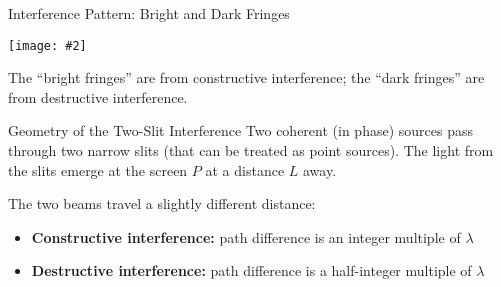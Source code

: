 \documentclass[12pt,compress,aspectratio=169]{beamer}
\newcommand{\pic}[2]{\texttt{[image: \#2]}}
\begin{document}
\begin{frame}{Interference Pattern: Bright and Dark Fringes}
  \begin{center}
    \pic{.4}{graphics/fringes1.png}
  \end{center}
  The ``bright fringes'' are from constructive interference; the ``dark
  fringes'' are from destructive interference.
\end{frame}



\begin{frame}{Geometry of the Two-Slit Interference}
  Two coherent (in phase) sources pass through two narrow slits (that can be
  treated as point sources). The light from the slits emerge at the screen $P$
  at a distance $L$ away.
  \begin{center}
  \end{center}
  \vspace{-.1in}The two beams travel a slightly different distance:
  \begin{itemize}
  \item\textbf{Constructive interference:} path difference is an integer
    multiple  of $\lambda$
  \item\textbf{Destructive interference:} path difference is a half-integer
    multiple  of $\lambda$
  \end{itemize}
\end{frame}
\end{document}
